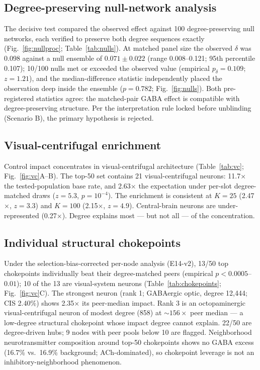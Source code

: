 \subsection{Degree-preserving null-network analysis}
The decisive test compared the observed effect against 100
degree-preserving null networks, each verified to preserve both degree
sequences exactly (Fig.~\ref{fig:nullproc}; Table~\ref{tab:nulls}). At
matched panel size the observed $\delta$ was 0.098 against a null
ensemble of $0.071\pm0.022$ (range 0.008--0.121; 95th percentile 0.107);
10/100 nulls met or exceeded the observed value (empirical
$p_\delta=0.109$; $z=1.21$), and the median-difference statistic
independently placed the observation deep inside the ensemble
($p=0.782$; Fig.~\ref{fig:nulls}). Both pre-registered statistics agree:
the matched-pair GABA effect is compatible with degree-preserving
structure. Per the interpretation rule locked before unblinding
(Scenario B), the primary hypothesis is rejected.

\subsection{Visual-centrifugal enrichment}
Control impact concentrates in visual-centrifugal architecture
(Table~\ref{tab:vc}; Fig.~\ref{fig:vc}A--B). The top-50 set contains
21 visual-centrifugal neurons: 11.7$\times$ the tested-population base
rate, and 2.63$\times$ the expectation under per-slot degree-matched
draws ($z=5.3$, $p=10^{-4}$). The enrichment is consistent at $K=25$
(2.47$\times$, $z=3.3$) and $K=100$ (2.15$\times$, $z=4.9$). Central-brain
neurons are under-represented (0.27$\times$). Degree explains most ---
but not all --- of the concentration.

\subsection{Individual structural chokepoints}
Under the selection-bias-corrected per-node analysis (E14-v2), 13/50 top
chokepoints individually beat their degree-matched peers (empirical
$p<0.0005$--$0.01$); 10 of the 13 are visual-system neurons
(Table~\ref{tab:chokepoints}; Fig.~\ref{fig:vc}C). The strongest neuron
(rank 1; GABAergic optic, degree 12,444; CIS 2.40\%) shows 2.35$\times$
its peer-median impact. Rank 3 is an octopaminergic visual-centrifugal
neuron of modest degree (858) at ${\sim}156\times$ peer median --- a
low-degree structural chokepoint whose impact degree cannot explain.
22/50 are degree-driven hubs; 9 nodes with peer pools below 10 are
flagged. Neighborhood neurotransmitter composition around top-50
chokepoints shows no GABA excess (16.7\% vs.\ 16.9\% background;
ACh-dominated), so chokepoint leverage is not an inhibitory-neighborhood
phenomenon.


